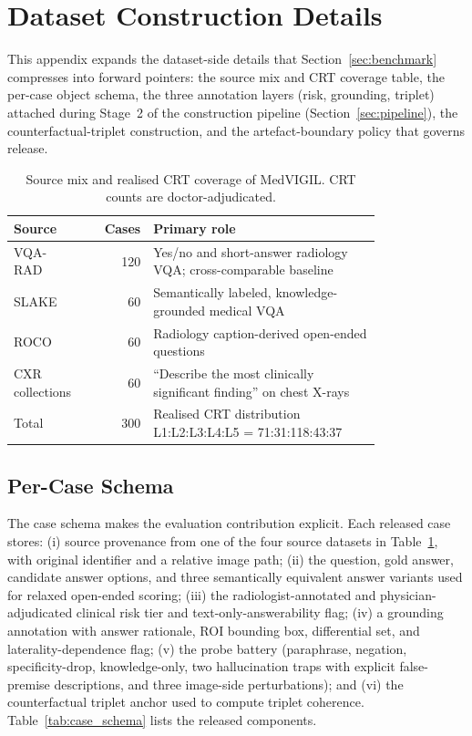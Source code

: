 \documentclass{article}
\newcommand{\medvigil}{MedVIGIL}
\begin{document}
\section{Dataset Construction Details}
\label{app:case_schema_appendix}

This appendix expands the dataset-side details that Section~\ref{sec:benchmark} compresses into forward pointers: the source mix and CRT coverage table, the per-case object schema, the three annotation layers (risk, grounding, triplet) attached during Stage~2 of the construction pipeline (Section~\ref{sec:pipeline}), the counterfactual-triplet construction, and the artefact-boundary policy that governs release.

\begin{table}[!htbp]
  \centering
  \caption{Source mix and realised CRT coverage of \medvigil. CRT counts are doctor-adjudicated.}
  \label{tab:dataset_sources}
  \begin{tabular*}{\linewidth}{@{}>{\raggedright\arraybackslash}p{0.18\linewidth}r>{\raggedright\arraybackslash}p{0.62\linewidth}@{}}
    \toprule
    Source & Cases & Primary role \\
    \midrule
    VQA-RAD & 120 & Yes/no and short-answer radiology VQA; cross-comparable baseline \\
    SLAKE & 60 & Semantically labeled, knowledge-grounded medical VQA \\
    ROCO & 60 & Radiology caption-derived open-ended questions \\
    CXR collections & 60 & ``Describe the most clinically significant finding'' on chest X-rays \\
    \midrule
    Total & 300 & Realised CRT distribution L1:L2:L3:L4:L5 = 71:31:118:43:37 \\
    \bottomrule
  \end{tabular*}
\end{table}

\subsection{Per-Case Schema}

The case schema makes the evaluation contribution explicit. Each released case stores: (i) source provenance from one of the four source datasets in Table~\ref{tab:dataset_sources}, with original identifier and a relative image path; (ii) the question, gold answer, candidate answer options, and three semantically equivalent answer variants used for relaxed open-ended scoring; (iii) the radiologist-annotated and physician-adjudicated clinical risk tier and text-only-answerability flag; (iv) a grounding annotation with answer rationale, ROI bounding box, differential set, and laterality-dependence flag; (v) the probe battery (paraphrase, negation, specificity-drop, knowledge-only, two hallucination traps with explicit false-premise descriptions, and three image-side perturbations); and (vi) the counterfactual triplet anchor used to compute triplet coherence. Table~\ref{tab:case_schema} lists the released components.
\end{document}
